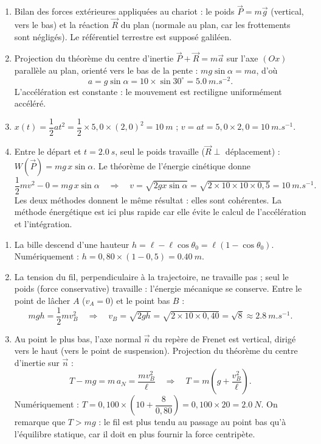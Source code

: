 \documentclass[11pt]{article}
\newcounter{popsec}
\newcounter{popsub}
\newcommand{\courssub}[1]{%
  \stepcounter{popsub}%
  \par\vspace{9pt}\noindent{\popxbold\fontsize{11.5}{13}\selectfont\color{popink}{\color{poporange}\thepopsec.\thepopsub}\hspace{6pt}#1}\par\nopagebreak\vspace{4pt}
}
\begin{document}
\courssub{Je m'entraîne}

\begin{corrige}
\begin{enumerate}
\item Bilan des forces extérieures appliquées au chariot : le poids $\vec{P} = m\vec{g}$ (vertical, vers le bas) et la réaction $\vec{R}$ du plan (normale au plan, car les frottements sont négligés). Le référentiel terrestre est supposé galiléen.
\item Projection du théorème du centre d'inertie $\vec{P} + \vec{R} = m\vec{a}$ sur l'axe $(Ox)$ parallèle au plan, orienté vers le bas de la pente : $mg\sin\alpha = ma$, d'où
\[ a = g\sin\alpha = 10 \times \sin 30^{\circ} = \SI{5,0}{m.s^{-2}}. \]
L'accélération est constante : le mouvement est rectiligne uniformément accéléré.
\item $x(t) = \dfrac{1}{2}at^2 = \dfrac{1}{2} \times 5{,}0 \times (2{,}0)^2 = \SI{10}{m}$ ; $v = at = 5{,}0 \times 2{,}0 = \SI{10}{m.s^{-1}}$.
\item Entre le départ et $t = \SI{2,0}{s}$, seul le poids travaille ($\vec{R} \perp$ déplacement) : $W(\vec{P}) = mg\,x\sin\alpha$. Le théorème de l'énergie cinétique donne
\[ \frac{1}{2}mv^2 - 0 = mg\,x\sin\alpha \quad\Rightarrow\quad v = \sqrt{2gx\sin\alpha} = \sqrt{2 \times 10 \times 10 \times 0{,}5} = \SI{10}{m.s^{-1}}. \]
Les deux méthodes donnent le même résultat : elles sont cohérentes. La méthode énergétique est ici plus rapide car elle évite le calcul de l'accélération et l'intégration.
\end{enumerate}
\end{corrige}

\begin{corrige}
\begin{enumerate}
\item La bille descend d'une hauteur $h = \ell - \ell\cos\theta_0 = \ell(1-\cos\theta_0)$. Numériquement : $h = 0{,}80 \times (1 - 0{,}5) = \SI{0,40}{m}$.
\item La tension du fil, perpendiculaire à la trajectoire, ne travaille pas ; seul le poids (force conservative) travaille : l'énergie mécanique se conserve. Entre le point de lâcher $A$ ($v_A = 0$) et le point bas $B$ :
\[ mgh = \frac{1}{2}mv_B^2 \quad\Rightarrow\quad v_B = \sqrt{2gh} = \sqrt{2 \times 10 \times 0{,}40} = \sqrt{8} \approx \SI{2,8}{m.s^{-1}}. \]
\item Au point le plus bas, l'axe normal $\vec{n}$ du repère de Frenet est vertical, dirigé vers le haut (vers le point de suspension). Projection du théorème du centre d'inertie sur $\vec{n}$ :
\[ T - mg = m\,a_N = \frac{mv_B^2}{\ell} \quad\Rightarrow\quad T = m\left(g + \frac{v_B^2}{\ell}\right). \]
Numériquement : $T = 0{,}100 \times \left(10 + \dfrac{8}{0{,}80}\right) = 0{,}100 \times 20 = \SI{2,0}{N}$. On remarque que $T > mg$ : le fil est plus tendu au passage au point bas qu'à l'équilibre statique, car il doit en plus fournir la force centripète.
\end{enumerate}
\end{corrige}
\end{document}
